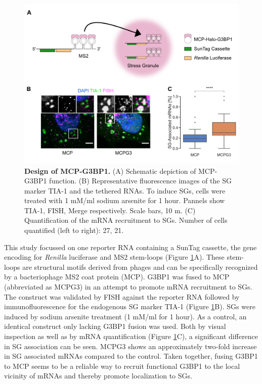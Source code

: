 \begin{figure}[b!]
    \centering
    \includegraphics[width=\linewidth]{images/figure2}
    \caption{\textbf{Design of MCP-G3BP1.}
        (A) Schematic depiction of MCP-G3BP1 function.
        (B) Representative fluorescence images of the SG marker
            TIA-1 and the tethered RNAs.
            To induce SGs, cells were treated with 1 mM/ml sodium arsenite for 1 hour.
            Pannels show TIA-1, FISH, Merge respectively.
            Scale bars, 10 \textmu m.
        (C) Quantification of the mRNA recruitment to SGs.
            Number of cells quantified (left to right): 27, 21. 
    }
    \label{fig:mcp_images}
\end{figure}

This study focussed on one reporter RNA containing a SunTag cassette, the gene encoding for \textit{Renilla} luciferase and MS2 stem-loops (Figure \ref{fig:mcp_images}A).
These stem-loops are structural motifs derived from phages and can be specifically recognized by a bacteriophage MS2 coat protein (MCP).
G3BP1 was fused to MCP (abbreviated as MCPG3) in an attempt to promote mRNA recruitment to SGs.
The construct was validated by FISH against the reporter RNA followed by immunofluorescence for the endogenous SG marker TIA-1 \cite{kedersha_rna-binding_1999} (Figure \ref{fig:mcp_images}B).
SGs were induced by sodium arsenite treatment (1 mM/ml for 1 hour).
As a control, an identical construct only lacking G3BP1 fusion was used.
Both by visual inspection as well as by mRNA quantification (Figure \ref{fig:mcp_images}C), a significant difference in SG association can be seen.
MCPG3 shows an approximately two-fold increase in SG associated mRNAs compared to the control.
Taken together, fusing G3BP1 to MCP seems to be a reliable way to recruit functional G3BP1 to the local vicinity of mRNAs and thereby promote localization to SGs.


